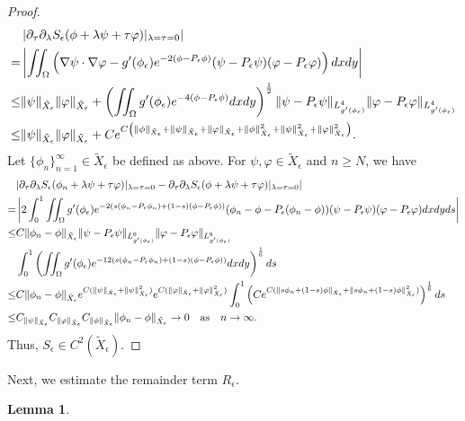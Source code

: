 \documentclass[1 [leqno, 11pt]{amsart}
\numberwithin{equation}{section}
\let\ep=\epsilon
\newtheorem{lemma}[Theorem]{Lemma}
\begin{document}
\begin{CJK*}{GBK}{song}
\begin{proof}
\begin{align*}
&\left|\partial_\tau\partial_\lambda S_\ep(\phi + \lambda\psi+\tau\varphi)|_{\lambda =\tau= 0}\right|\\
=& \left|\iint_{\Omega}\left(\nabla\psi\cdot\nabla\varphi- g'(\phi_\ep) e^{-2(\phi-P_\ep\phi)}(\psi-P_\ep\psi)(\varphi-P_\ep\varphi)\right)dxdy\right|\\
\leq&\|\psi\|_{\tilde{X}_\ep}\|\varphi\|_{\tilde{X}_\ep}+\left(\iint_{\Omega} g'(\phi_\ep) e^{-4(\phi-P_\ep\phi)} dxdy\right)^{1\over2}
\|\psi-P_\ep\psi\|_{L_{g'(\phi_\ep)}^4}\|\varphi-P_\ep\varphi\|_{L_{g'(\phi_\ep)}^4}\\
\leq&\|\psi\|_{\tilde{X}_\ep}\|\varphi\|_{\tilde{X}_\ep}+Ce^{C\left(\|\phi\|_{\tilde{X}_\ep}+\|\psi\|_{\tilde{X}_\ep}+\|\varphi\|_{\tilde{X}_\ep}+
\|\phi\|_{\tilde{X}_\ep}^2+\|\psi\|_{\tilde{X}_\ep}^2+\|\varphi\|_{\tilde{X}_\ep}^2\right)}.
\end{align*}
Let  $\{\phi_n\}_{n=1}^\infty\in \tilde X_\ep$ be defined as above.
  For  $\psi,\varphi\in\tilde X_\ep$ and $n\geq N$, we have
\begin{align*}
&|\partial_\tau\partial_\lambda S_\ep(\phi_n + \lambda \psi+\tau\varphi)|_{\lambda =\tau= 0}-\partial_\tau\partial_\lambda S_\ep(\phi + \lambda \psi+\tau\varphi)|_{\lambda =\tau= 0}|\\
=&\left|2\int_0^1\iint_{\Omega}g'(\phi_\ep) e^{-2(s(\phi_n-P_\ep\phi_n) + (1-s)(\phi-P_\ep\phi))}(\phi_n - \phi-P_\ep(\phi_n-\phi))(\psi-P_\ep\psi)(\varphi-P_\ep\varphi) dxdyds\right|\\
\leq&C\|\phi_n-\phi\|_{\tilde X_\ep}\|\psi-P_\ep\psi\|_{L_{g'(\phi_\ep)}^6}\|\varphi-P_\ep\varphi\|_{L_{g'(\phi_\ep)}^6}\\
&\int_0^1\left(\iint_{\Omega}g'(\phi_\ep) e^{-12(s(\phi_n-P_\ep\phi_n) + (1-s)(\phi-P_\ep\phi))}dxdy\right)^{1\over6}ds\\
\leq&C\|\phi_n-\phi\|_{\tilde X_\ep}
e^{C(\|\psi\|_{\tilde X_\ep}+\|\psi\|_{\tilde X_\ep}^2)}e^{C(\|\varphi\|_{\tilde X_\ep}+\|\varphi\|_{\tilde X_\ep}^2)}
\int_0^1\left(Ce^{C(\|s\phi_n + (1-s)\phi\|_{\tilde X_\ep}+\|s\phi_n + (1-s)\phi\|_{\tilde X_\ep}^2)}\right)^{1\over6}ds\\
\leq &C_{\|\psi\|_{\tilde X_\ep}}C_{\|\varphi\|_{\tilde X_\ep}}C_{\|\phi\|_{\tilde X_\ep}}\|\phi_n-\phi\|_{\tilde X_\ep}\to 0\quad \text{as}\quad n\to\infty.
\end{align*}
Thus, $S_\ep\in C^2(\tilde X_\ep)$.
\end{proof}
Next, we estimate the remainder term $R_\ep$.
\begin{lemma} \label{remainder term R}

\end{lemma}
\end{CJK*}
\end{document}

